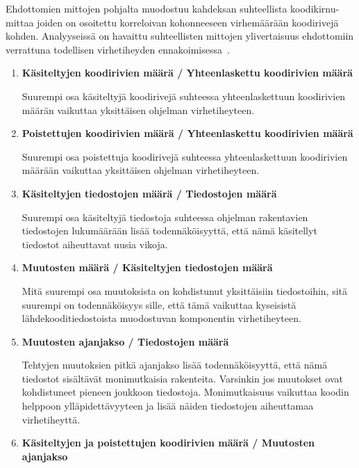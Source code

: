 \documentclass[finnish]{../tktltiki2}
\theoremstyle{definition}
\theoremstyle{remark}
\begin{document}
    Ehdottomien mittojen pohjalta muodostuu kahdeksan suhteellista koodikirnu-mittaa joiden on osoitettu korreloivan 
kohonneeseen virhemäärään koodirivejä kohden. Analyyseissä on havaittu suhteellisten mittojen ylivertaisuus ehdottomiin 
verrattuna todellisen virhetiheyden ennakoimisessa~\cite{NB05}.

\begin{enumerate}
    
    \item {\bf Käsiteltyjen koodirivien määrä / Yhteenlaskettu koodirivien määrä}
    
    Suurempi osa käsiteltyjä koodirivejä suhteessa yhteenlaskettuun koodirivien määrän vaikuttaa yksittäisen ohjelman 
    virhetiheyteen.
    
    \item {\bf Poistettujen koodirivien määrä / Yhteenlaskettu koodirivien määrä}
    
    Suurempi osa poistettuja koodirivejä suhteessa yhteenlaskettuun koodirivien määrään vaikuttaa yksittäisen ohjelman 
    virhetiheyteen.
    
    \item {\bf Käsiteltyjen tiedostojen määrä / Tiedostojen määrä}
    
    Suurempi osa käsiteltyjä tiedostoja suhteessa ohjelman rakentavien tiedostojen lukumäärään lisää todennäköisyyttä, 
    että nämä käsitellyt tiedostot aiheuttavat uusia vikoja.
    
    \item {\bf Muutosten määrä / Käsiteltyjen tiedostojen määrä}
    
    Mitä suurempi osa muutoksista on kohdistunut yksittäisiin tiedostoihin, sitä suurempi on todennäköisyys sille, että 
    tämä vaikuttaa kyseisistä lähdekooditiedostoista muodostuvan komponentin virhetiheyteen.

    \item {\bf Muutosten ajanjakso / Tiedostojen määrä}
    
    Tehtyjen muutoksien pitkä ajanjakso lisää todennäköisyyttä, että nämä tiedostot sisältävät monimutkaisia rakenteita. 
    Varsinkin jos muutokset ovat kohdistuneet pieneen joukkoon tiedostoja. Monimutkaisuus vaikuttaa koodin helppoon 
    ylläpidettävyyteen ja lisää näiden tiedostojen aiheuttamaa virhetiheyttä.

    \item {\bf Käsiteltyjen ja poistettujen koodirivien määrä / Muutosten ajanjakso}
    

\end{enumerate}
\end{document}
